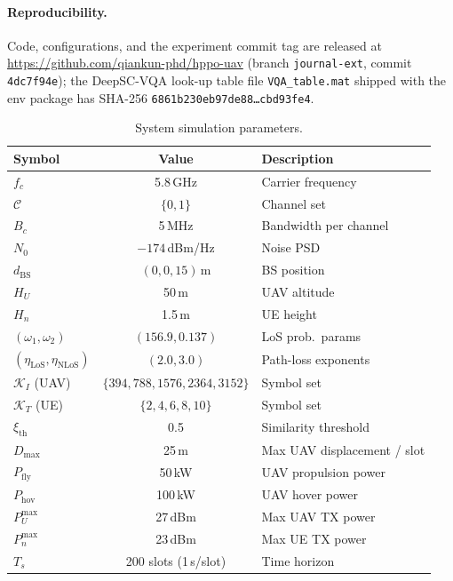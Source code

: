 \paragraph{Reproducibility.} Code, configurations, and the experiment
commit tag are released at
\url{https://github.com/qiankun-phd/hppo-uav} (branch \texttt{journal-ext},
commit \texttt{4dc7f94e}); the DeepSC-VQA look-up table file
\texttt{VQA\_table.mat} shipped with the env package has SHA-256
\texttt{6861b230eb97de88\dots cbd93fe4}.

\begin{table}[t]
  \caption{System simulation parameters.}
  \label{tab:params}
  \centering
  \footnotesize
  \begin{tabular}{lcl}
  \toprule
  Symbol & Value & Description \\
  \midrule
  $f_c$                 & 5.8\,GHz & Carrier frequency \\
  $\mathcal{C}$         & $\{0,1\}$ & Channel set \\
  $B_c$                 & 5\,MHz   & Bandwidth per channel \\
  $N_0$                 & $-174$\,dBm/Hz & Noise PSD \\
  $d_{\mathrm{BS}}$     & $(0,0,15)$\,m & BS position \\
  $H_U$                 & 50\,m   & UAV altitude \\
  $H_n$                 & 1.5\,m  & UE height \\
  $(\omega_1,\omega_2)$ & $(156.9, 0.137)$ & LoS prob.\ params \\
  $(\eta_{\mathrm{LoS}},\eta_{\mathrm{NLoS}})$ & $(2.0,3.0)$ & Path-loss exponents \\
  $\mathcal{K}_I$ (UAV) & $\{394,788,1576,2364,3152\}$ & Symbol set \\
  $\mathcal{K}_T$ (UE)  & $\{2,4,6,8,10\}$ & Symbol set \\
  $\xi_{\mathrm{th}}$   & 0.5  & Similarity threshold \\
  $D_{\max}$            & 25\,m  & Max UAV displacement / slot \\
  $P_{\mathrm{fly}}$    & 50\,kW & UAV propulsion power \\
  $P_{\mathrm{hov}}$    & 100\,kW & UAV hover power \\
  $P^{\max}_{U}$        & 27\,dBm & Max UAV TX power \\
  $P^{\max}_{n}$        & 23\,dBm & Max UE TX power \\
  $T_s$                 & 200 slots (1\,s/slot) & Time horizon \\

\end{tabular}
\end{table}
